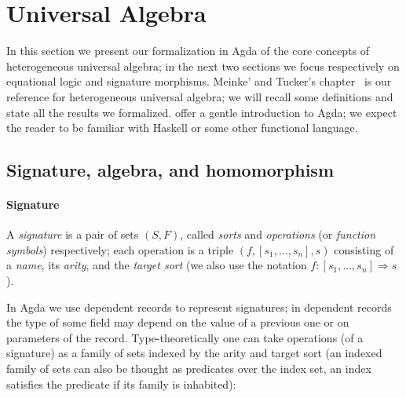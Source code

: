 \section{Universal Algebra}
\label{sec:univ-alg}

In this section we present our formalization in Agda of the core
concepts of heterogeneous universal algebra; in the next two sections
we focus respectively on equational logic and signature morphisms.
Meinke' and Tucker's chapter~\citeyearpar{meinke-tucker-1992} is our
reference for heterogeneous universal algebra; we will recall some
definitions and state all the results we formalized. \cite{agda-intro}
offer a gentle introduction to Agda; we expect the reader to be
familiar with Haskell or some other functional language.

\subsection{Signature, algebra, and homomorphism}

\paragraph*{Signature}

A \emph{signature} is a pair of sets $(S,F)$, called \textit{sorts}
and \textit{operations} (or \textit{function symbols}) respectively;
each operation is a triple $(f,[s_1,\ldots,s_n],s)$ consisting of a
\textit{name}, its \textit{arity}, and the \textit{target sort} (we
also use the notation $f \colon [s_1,...,s_n] \Rightarrow s$).

In Agda we use dependent records to represent signatures; in dependent
records the type of some field may depend on the value of a previous
one or on parameters of the record. Type-theoretically one can take
operations (of a signature) as a family of sets indexed by the arity
and target sort (an indexed family of sets can also be thought as
predicates over the index set, an index satisfies the predicate if its
family is inhabited):
\begin{code}
\>[0]\AgdaSpace{}%
\AgdaSpace{}%
\AgdaSymbol{:}\AgdaSpace{}%
\AgdaSpace{}%
\<%
\\
\>[0][@{}l@{\AgdaIndent{0}}]%
\>[2]\<%
\\
\>[2][@{}l@{\AgdaIndent{0}}]%
\>[4]%
\>[11]\AgdaSymbol{:}\AgdaSpace{}%
\<%
\\
%
\>[4]%
\>[11]\AgdaSymbol{:}\AgdaSpace{}%
\AgdaSymbol{(}\AgdaSpace{}%
\AgdaSymbol{)}\AgdaSpace{}%
\AgdaSpace{}%
\AgdaSpace{}%
\AgdaSpace{}%
\<%
\end{code}


